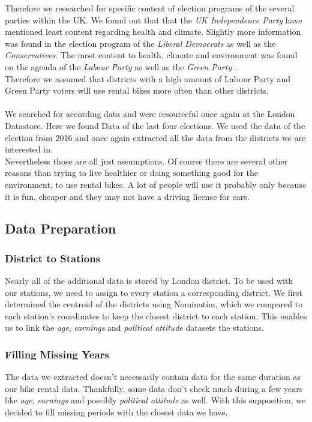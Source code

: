 Therefore we researched for specific content of election programs of the several parties within the UK.
We found out that that the \emph{UK Independence Party} have mentioned least content regarding health and climate. Slightly more information was found in the election program of the \emph{Liberal Democrats} as well as the \emph{Conservatives}. The most content to health, climate and environment was found on the agenda of the \emph{Labour Party} as well as the \emph{Green Party} \cite{SandraLavilleJohnSauven2017}.\\ Therefore we assumed that districts with a high amount of Labour Party and Green Party voters will use rental bikes more often than other districts.\\\\
We searched for according data and were resourceful once again at the London Datastore. Here we found Data of the last four elections. We used the data of the election from 2016 and once again extracted all the data from the districts we are interested in.\\
Nevertheless those are all just assumptions. Of course there are several other reasons than trying to live healthier or doing something good for the environment, to use rental bikes. A lot of people will use it probably only because it is fun, cheaper and they may not have a driving license for cars.  
\subsection{Data Preparation}\label{sec:dpadditional}
\subsubsection{District to Stations}

Nearly all of the additional data is stored by London district.
To be used with our stations, we need to assign to every station a corresponding
district.
We first determined the centroid of the districts using Nominatim, which we compared
to each station's coordinates to keep the closest district to each station.
This enables us to link the \emph{age}, \emph{earnings} and \emph{political attitude}
datasets the stations.

\subsubsection{Filling Missing Years}

The data we extracted doesn't necessarily contain data for the same duration as our
bike rental data. Thankfully, some data don't check much during a few years like
\emph{age}, \emph{earnings} and possibly \emph{political attitude} as well.
With this supposition, we decided to fill missing periods with the closest data
we have.

